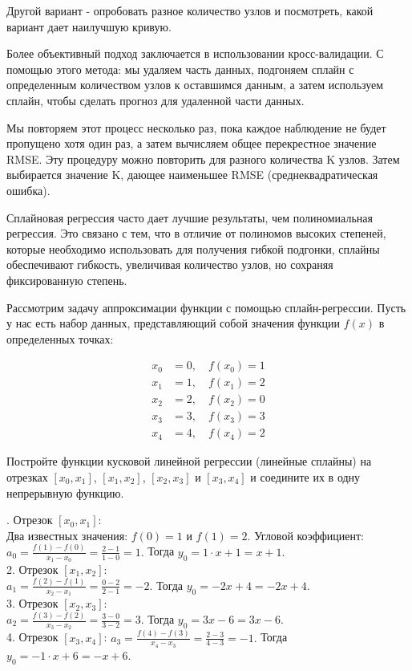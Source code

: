 {Другой вариант - опробовать разное количество узлов и посмотреть, какой вариант дает наилучшую кривую.

Более объективный подход заключается в использовании кросс-валидации. С помощью этого метода: мы удаляем часть данных, подгоняем сплайн с определенным количеством узлов к оставшимся данным, а затем используем сплайн, чтобы сделать прогноз для удаленной части данных.

Мы повторяем этот процесс несколько раз, пока каждое наблюдение не будет пропущено хотя один раз, а затем вычисляем общее перекрестное значение RMSE. Эту процедуру можно повторить для разного количества K узлов. Затем выбирается значение K, дающее наименьшее RMSE (среднеквадратическая ошибка).

Сплайновая регрессия часто дает лучшие результаты, чем полиномиальная регрессия. Это связано с тем, что в отличие от полиномов высоких степеней, которые необходимо использовать для получения гибкой подгонки, сплайны обеспечивают гибкость, увеличивая количество узлов, но сохраняя фиксированную степень.


\problem Рассмотрим задачу аппроксимации функции с помощью сплайн-регрессии. Пусть у нас есть набор данных, представляющий собой значения функции \(f(x)\) в определенных точках:

\begin{align*}
x_0 & = 0, \quad f(x_0) = 1 \\
x_1 & = 1, \quad f(x_1) = 2 \\
x_2 & = 2, \quad f(x_2) = 0 \\
x_3 & = 3, \quad f(x_3) = 3 \\
x_4 & = 4, \quad f(x_4) = 2
\end{align*}

Постройте функции кусковой линейной регрессии (линейные сплайны) на отрезках \([x_0, x_1]\), \([x_1, x_2]\), \([x_2, x_3]\) и \([x_3, x_4]\) и соедините их в одну непрерывную функцию.

. Отрезок \([x_0, x_1]\):\\
Два известных значения: \(f(0) = 1\) и \(f(1) = 2\). Угловой коэффициент: 
     $\displaystyle     a_0 = \frac{f(1) - f(0)}{x_1 - x_0} = \frac{2 - 1}{1 - 0} = 1.$ Тогда $y_0 = 1 \cdot x + 1 = x + 1.$\\
2. Отрезок \([x_1, x_2]\):\\
     $\displaystyle     a_1 = \frac{f(2) - f(1)}{x_2 - x_1} = \frac{0 - 2}{2 - 1} = -2.$ Тогда $y_0 = -2 x + 4 = -2x + 4.$\\
3. Отрезок \([x_2, x_3]\):\\
       $\displaystyle     a_2 = \frac{f(3) - f(2)}{x_3 - x_2} = \frac{3 - 0}{3 - 2} = 3.$ Тогда $y_0 = 3x - 6 = 3x-6.$\\
4. Отрезок \([x_3, x_4]\):
    $\displaystyle     a_3 = \frac{f(4) - f(3)}{x_4 - x_3} = \frac{2 - 3}{4 - 3} = -1.$ Тогда $y_0 = -1\cdot x + 6 = -x + 6.$

}
